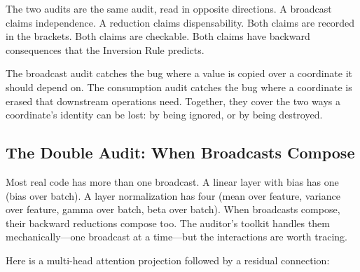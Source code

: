 \documentclass[11pt,titlepage]{article}
\begin{document}
The two audits are the same audit, read in opposite directions. A
broadcast claims independence. A reduction claims dispensability. Both
claims are recorded in the brackets. Both claims are checkable. Both
claims have backward consequences that the Inversion Rule predicts.

The broadcast audit catches the bug where a value is copied over a
coordinate it should depend on. The consumption audit catches the bug
where a coordinate is erased that downstream operations need. Together,
they cover the two ways a coordinate's identity can be lost: by being
ignored, or by being destroyed.

\vspace{2em}

\hypertarget{the-double-audit-when-broadcasts-compose}{%
\subsection{The Double Audit: When Broadcasts
Compose}\label{the-double-audit-when-broadcasts-compose}}

Most real code has more than one broadcast. A linear layer with bias has
one (bias over batch). A layer normalization has four (mean over
feature, variance over feature, gamma over batch, beta over batch). When
broadcasts compose, their backward reductions compose too. The auditor's
toolkit handles them mechanically---one broadcast at a time---but the
interactions are worth tracing.

Here is a multi-head attention projection followed by a residual
connection:
\end{document}
